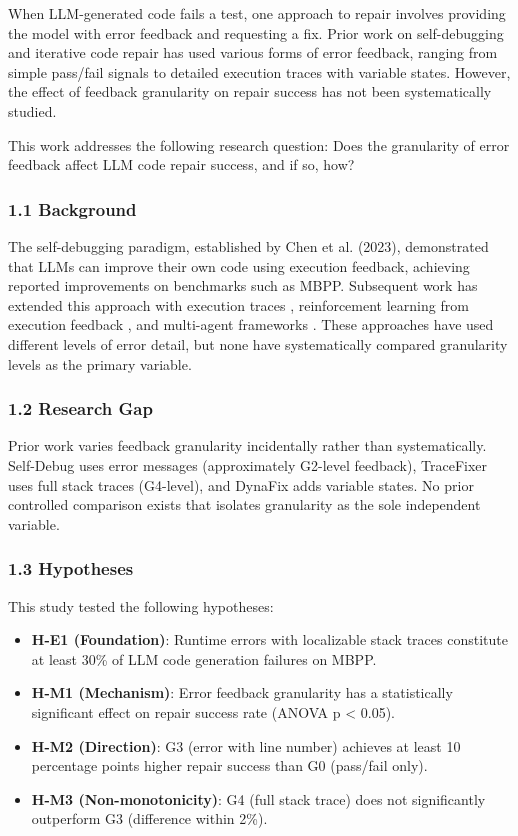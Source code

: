 
When LLM-generated code fails a test, one approach to repair involves providing the model with error feedback and requesting a fix. Prior work on self-debugging and iterative code repair has used various forms of error feedback, ranging from simple pass/fail signals to detailed execution traces with variable states. However, the effect of feedback granularity on repair success has not been systematically studied.

This work addresses the following research question: Does the granularity of error feedback affect LLM code repair success, and if so, how?

\subsubsection{1.1 Background}

The self-debugging paradigm, established by Chen et al. (2023), demonstrated that LLMs can improve their own code using execution feedback, achieving reported improvements on benchmarks such as MBPP. Subsequent work has extended this approach with execution traces \citep{bouzenia2024repairagent}, reinforcement learning from execution feedback \citep{gehring2024rlef}, and multi-agent frameworks \citep{Huang2026}. These approaches have used different levels of error detail, but none have systematically compared granularity levels as the primary variable.

\subsubsection{1.2 Research Gap}

Prior work varies feedback granularity incidentally rather than systematically. Self-Debug uses error messages (approximately G2-level feedback), TraceFixer uses full stack traces (G4-level), and DynaFix adds variable states. No prior controlled comparison exists that isolates granularity as the sole independent variable.

\subsubsection{1.3 Hypotheses}

This study tested the following hypotheses:

\begin{itemize}
\item \textbf{H-E1 (Foundation)}: Runtime errors with localizable stack traces constitute at least 30\% of LLM code generation failures on MBPP.
\item \textbf{H-M1 (Mechanism)}: Error feedback granularity has a statistically significant effect on repair success rate (ANOVA p < 0.05).
\item \textbf{H-M2 (Direction)}: G3 (error with line number) achieves at least 10 percentage points higher repair success than G0 (pass/fail only).
\item \textbf{H-M3 (Non-monotonicity)}: G4 (full stack trace) does not significantly outperform G3 (difference within 2\%).
\end{itemize}

